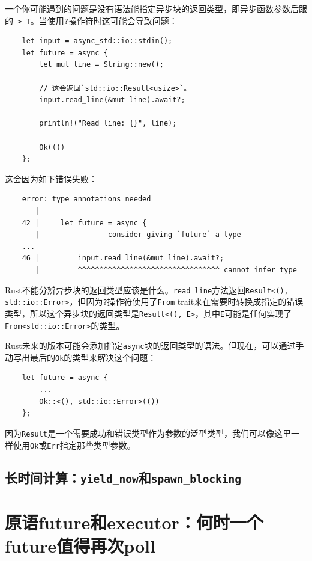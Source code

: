 一个你可能遇到的问题是没有语法能指定异步块的返回类型，即异步函数参数后跟的\texttt{-> T}。当使用\texttt{?}操作符时这可能会导致问题：
\begin{verbatim}
    let input = async_std::io::stdin();
    let future = async {
        let mut line = String::new();

        // 这会返回`std::io::Result<usize>`。
        input.read_line(&mut line).await?;

        println!("Read line: {}", line);

        Ok(())
    };
\end{verbatim}

这会因为如下错误失败：
\begin{verbatim}
    error: type annotations needed
       |
    42 |     let future = async {
       |         ------ consider giving `future` a type
    ...
    46 |         input.read_line(&mut line).await?;
       |         ^^^^^^^^^^^^^^^^^^^^^^^^^^^^^^^^^ cannot infer type
\end{verbatim}

Rust不能分辨异步块的返回类型应该是什么。\texttt{read\_line}方法返回\texttt{Result<(), std::io::Error>}，但因为\texttt{?}操作符使用了\texttt{From} trait来在需要时转换成指定的错误类型，所以这个异步块的返回类型是\texttt{Result<(), E>}，其中\texttt{E}可能是任何实现了\texttt{From<std::io::Error>}的类型。

Rust未来的版本可能会添加指定\texttt{async}块的返回类型的语法。但现在，可以通过手动写出最后的\texttt{Ok}的类型来解决这个问题：
\begin{verbatim}
    let future = async {
        ...
        Ok::<(), std::io::Error>(())
    };
\end{verbatim}

因为\texttt{Result}是一个需要成功和错误类型作为参数的泛型类型，我们可以像这里一样使用\texttt{Ok}或\texttt{Err}指定那些类型参数。



\subsection{长时间计算：\texttt{yield\_now}和\texttt{spawn\_blocking}}\label{LongCompute}

\section{原语future和executor：何时一个future值得再次poll}\label{WhenPoll}
